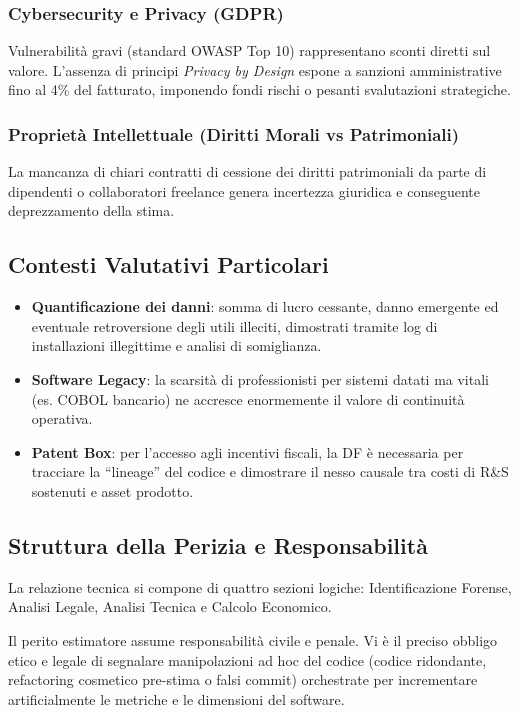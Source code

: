 \documentclass[11pt,a4paper]{article}
\begin{document}
\subsubsection{Cybersecurity e Privacy (GDPR)}
Vulnerabilità gravi (standard OWASP Top 10) rappresentano sconti diretti sul valore. L'assenza di principi \textit{Privacy by Design} espone a sanzioni amministrative fino al 4\% del fatturato, imponendo fondi rischi o pesanti svalutazioni strategiche.

\subsubsection{Proprietà Intellettuale (Diritti Morali vs Patrimoniali)}
La mancanza di chiari contratti di cessione dei diritti patrimoniali da parte di dipendenti o collaboratori freelance genera incertezza giuridica e conseguente deprezzamento della stima.

\subsection{Contesti Valutativi Particolari}
\begin{itemize}
    \item \textbf{Quantificazione dei danni}: somma di lucro cessante, danno emergente ed eventuale retroversione degli utili illeciti, dimostrati tramite log di installazioni illegittime e analisi di somiglianza.
    \item \textbf{Software Legacy}: la scarsità di professionisti per sistemi datati ma vitali (es. COBOL bancario) ne accresce enormemente il valore di continuità operativa.
    \item \textbf{Patent Box}: per l'accesso agli incentivi fiscali, la DF è necessaria per tracciare la ``lineage'' del codice e dimostrare il nesso causale tra costi di R\&S sostenuti e asset prodotto.
\end{itemize}

\subsection{Struttura della Perizia e Responsabilità}
La relazione tecnica si compone di quattro sezioni logiche: Identificazione Forense, Analisi Legale, Analisi Tecnica e Calcolo Economico.

Il perito estimatore assume responsabilità civile e penale. Vi è il preciso obbligo etico e legale di segnalare manipolazioni ad hoc del codice (codice ridondante, refactoring cosmetico pre-stima o falsi commit) orchestrate per incrementare artificialmente le metriche e le dimensioni del software.
\end{document}
